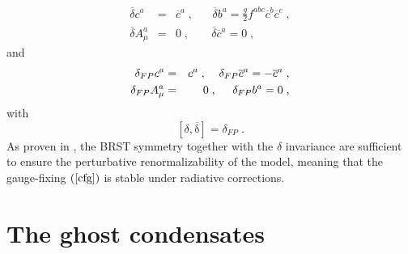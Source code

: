 \documentclass[a4paper,12pt]{article}
\begin{document}
\begin{eqnarray}
\overline{\delta }c^{a} &=&\overline{c}^{a}\;,\;\;\;\;\;\;\overline{\delta }%
b^{a}=\frac{g}{2}f^{abc}\overline{c}^{b}\overline{c}^{c}\;,  \label{db} \\
\overline{\delta }A_{\mu }^{a} &=&0\;,\;\;\;\;\;\;\;\overline{\delta }%
\overline{c}^{a}=0\;,  \nonumber
\end{eqnarray}
and 
\begin{eqnarray}
\delta _{FP}c^{a} &=&c^{a}\;,\;\;\;\;\delta _{FP}\overline{c}^{a}=-\overline{%
c}^{a}\;,  \label{fp} \\
\delta _{FP}A_{\mu }^{a} &=&0\;,\;\;\;\;\;\delta _{FP}b^{a}=0\;,  \nonumber
\end{eqnarray}
with 
\begin{equation}
\left[ \delta \mathrm{{,}\overline{\delta }}\right] =\delta _{FP}\;.
\label{al}
\end{equation}
As proven in \cite{ds}, the BRST$\;$symmetry together with the $\delta $
invariance are sufficient to ensure the perturbative renormalizability of
the model, meaning that the gauge-fixing $\left( \ref{cfg}\right) $ is
stable under radiative corrections.

\section{The ghost condensates}
\end{document}

